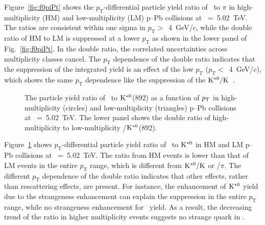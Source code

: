 Figure~\ref{fig:f0piPt} shows the $p_{\mathrm{T}}$-differential particle yield ratio of \fzero~to $\pi$ in high-multiplicity (HM) and low-multiplicity (LM) p--Pb collisions at \snn~=~5.02~TeV. The ratios are consistent within one sigma in $p_{\mathrm{T}}>$~4~GeV/$c$, while the double ratio of HM to LM is suppressed at a lower $p_{\mathrm{T}}$ as shown in the lower panel of Fig.~\ref{fig:f0piPt}. In the double ratio, the correlated uncertainties across multiplicity classes cancel. The $p_{\mathrm{T}}$ dependence of the double ratio indicates that the suppression of the integrated yield is an effect of the low $p_{\mathrm{T}}$ ($p_{\mathrm{T}}<$~4~GeV/$c$), which shows the same $p_{\mathrm{T}}$ dependence like the suppression of the $\rm{}K^{*0}/K$~\cite{ALICE:2019etb}.

\begin{figure}[!hbt]
	\centering
	\caption{The particle yield ratio of \fzero~to $\rm{}K^{*0}$(892) as a function of $p_{\rm{T}}$ in high-multiplicity (circles) and low-multiplicity (triangles) p--Pb collisions at \snn~=~5.02~TeV. The lower panel shows the double ratio of high-multiplicity to low-multiplicity \fzero/$\rm{}K^{*0}$(892).  }
	\label{fig:f0KsPt}
\end{figure}

Figure~\ref{fig:f0KsPt} shows $p_{\mathrm{T}}$-differential particle yield ratio of \fzero~to $\rm{}K^{*0}$ in HM and LM p--Pb collisions at \snn~=~5.02~TeV. The ratio from HM events is lower than that of LM events in the entire $p_{\mathrm{T}}$ range, which is different from $\rm{}K^{*0}/K$ or \fzero/$\pi$. The different $p_{\mathrm{T}}$ dependence of the double ratio indicates that other effects, rather than rescattering effects, are present. For instance, the enhancement of $\rm{}K^{*0}$ yield due to the strangeness enhancement can explain the suppression in the entire $p_{\mathrm{T}}$ range, while no strangeness enhancement for \fzero~yield. As a result, the decreasing trend of the ratio in higher multiplicity events suggests no strange quark in \fzero.

